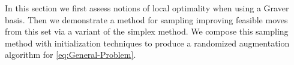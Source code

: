\documentclass[pdflatex,sn-mathphys-num]{sn-jnl}%
\DeclareMathOperator{\Ecal}{\mathcal{E}}
\DeclareMathOperator{\Vcal}{\mathcal{V}}
\begin{document}
In this section we first assess notions of local optimality when using a Graver basis. Then we demonstrate a method for sampling improving feasible moves from this set via a variant of the simplex method. We compose this sampling method with initialization techniques to produce a randomized augmentation algorithm for \eqref{eq:General-Problem}.




\end{document}
